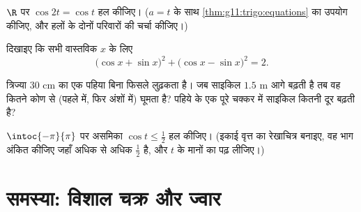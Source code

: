 \begin{exercise}[$\star\star$]\label{exo:g11:trigo:8}
$\R$ पर  $\cos 2t = \cos t$ हल कीजिए। ($a = t$ के साथ \cref{thm:g11:trigo:equations} का उपयोग कीजिए, और हलों
के दोनों परिवारों की चर्चा कीजिए।)
\end{exercise}

\begin{exercise}[$\star\star$]\label{exo:g11:trigo:9}
दिखाइए कि सभी वास्तविक $x$ के लिए
\[
\bigl(\cos x + \sin x\bigr)^2 + \bigl(\cos x - \sin x\bigr)^2 = 2 .
\]
\end{exercise}

\begin{exercise}[$\star\star$]\label{exo:g11:trigo:10}
त्रिज्या $30$ cm का एक पहिया बिना फिसले लुढ़कता है। जब साइकिल $1.5$ m आगे
बढ़ती है तब वह कितने कोण से (पहले  में, फिर अंशों में) घूमता है? पहिये
के एक पूरे चक्कर में साइकिल कितनी दूर बढ़ती है?
\end{exercise}

\begin{exercise}[$\star\star\star$]\label{exo:g11:trigo:11}
$\intoc{-\pi}{\pi}$ पर असमिका $\cos t \leq \frac12$ हल कीजिए। (इकाई वृत्त का रेखाचित्र बनाइए, वह भाग
अंकित कीजिए जहाँ  अधिक से अधिक $\frac12$ है, और $t$ के मानों का  पढ़
लीजिए।)
\end{exercise}

\section{समस्या: विशाल चक्र और ज्वार}

